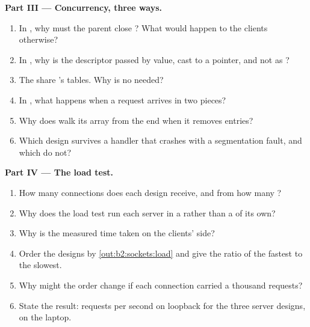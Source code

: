\begin{problem}
\medskip\noindent\textbf{Part III --- Concurrency, three ways.}\par\nopagebreak
\begin{enumerate}[resume, beginpenalty=10000]
\item In , why must the parent close ? What would happen to the clients otherwise?
\item In , why is the descriptor passed by value, cast to a pointer, and not as ?
\item The  share 's tables. Why is no  needed?
\item In , what happens when a request arrives in two pieces?
\item Why does  walk its array from the end when it removes entries?
\item Which design survives a handler that crashes with a segmentation fault, and which do not?
\end{enumerate}

\medskip\noindent\textbf{Part IV --- The load test.}\par\nopagebreak
\begin{enumerate}[resume, beginpenalty=10000]
\item How many connections does each design receive, and from how many ?
\item Why does the load test run each server in a  rather than a  of its own?
\item Why is the measured time taken on the clients' side?
\item Order the designs by \cref{out:b2:sockets:load} and give the ratio of the fastest to the slowest.
\item Why might the order change if each connection carried a thousand requests?
\item State the result: requests per second on loopback for the three server designs, on the laptop.
\end{enumerate}
\end{problem}
